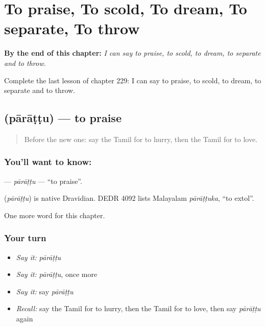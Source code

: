 
\chapter{To praise, To scold, To dream, To separate, To throw}
\label{ch:ta-to-praise-to-scold-to-dream-to-separate-to-throw}

\begin{chapteropening}
\textbf{By the end of this chapter:} \emph{I can say to praise, to scold, to dream, to separate and to throw.}

Complete the last lesson of chapter 229: I can say to praise, to scold, to dream, to separate and to throw.
\end{chapteropening}

\section[\texorpdfstring{\ta{பாராட்டு} (pārāṭṭu)}{பாராட்டு (pārāṭṭu)}]{ (pārāṭṭu) — to praise}

\label{lesson:TA-C229-parattu}



\begin{quote}
Before the new one: say the Tamil for to hurry, then the Tamil for to love.
\end{quote}

\subsection*{You'll want to know: }
\textbf{} — \emph{pārāṭṭu} — \textquotedblleft{}to praise\textquotedblright{}.

\begin{cousinweb}
\textbf{} (\emph{pārāṭṭu}) is native Dravidian. DEDR 4092 lists Malayalam \emph{pārāṭṭuka}, \textquotedblleft{}to extol\textquotedblright{}.
\end{cousinweb}

\begin{grammarlens}[title={What you've built}]
One more word for this chapter.
\end{grammarlens}

\subsection*{Your turn}
\begin{itemize}
\raggedright
  \item \emph{Say it:} \emph{pārāṭṭu}
  \item \emph{Say it:} \emph{pārāṭṭu}, once more
  \item \emph{Say it:} say \emph{pārāṭṭu}
  \item \emph{Recall:} say the Tamil for to hurry, then the Tamil for to love, then say \emph{pārāṭṭu} again
\end{itemize}


